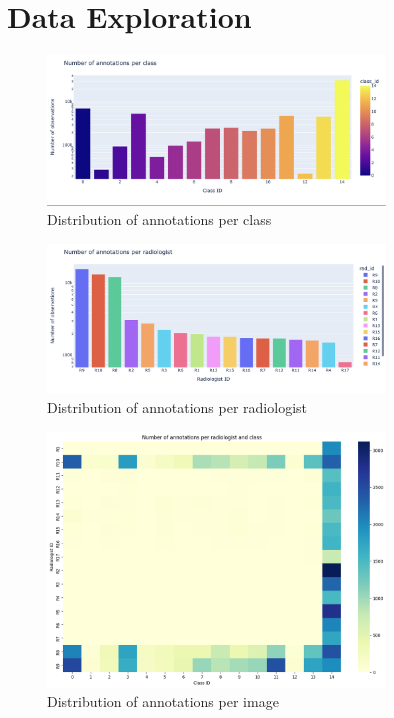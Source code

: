 \documentclass[12pt,oneside]{book} %
\begin{document}
\section{Data Exploration}

\begin{figure}[H]
    \centering
    \includegraphics[width=0.8\textwidth]{../results/annotations_per_class.png}
    \caption{Distribution of annotations per class}
    \label{fig:annotations_per_class}
\end{figure}

\begin{figure}[H]
    \centering
    \includegraphics[width=0.8\textwidth]{../results/annotations_per_rad.png}
    \caption{Distribution of annotations per radiologist}
    \label{fig:aannotations_per_rad}
\end{figure}

\begin{figure}[H]
    \centering
    \includegraphics[width=0.8\textwidth]{../results/annotations_per_rad_class.png}
    \caption{Distribution of annotations per image}
    \label{fig:annotations_per_rad_class}
\end{figure}
\end{document}
